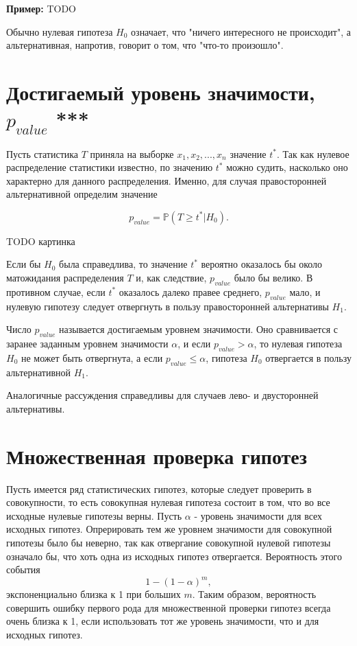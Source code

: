 \textbf{Пример:} TODO

Обычно нулевая гипотеза $H_0$ означает, что "ничего интересного не происходит", а альтернативная, напротив, говорит о том, что "что-то произошло".

\section{Достигаемый уровень значимости, $p_{value}$ ***}

Пусть статистика $T$ приняла на выборке $x_1, x_2, ..., x_n$ значение $t^*$. Так как нулевое распределение статистики известно, по значению $t^*$ можно судить, насколько оно характерно для данного распределения. Именно, для случая правосторонней альтернативной определим значение

$$
p_{value} = \mathbb{P}(T \geqslant t^* | H_0).
$$

TODO картинка

Если бы $H_0$ была справедлива, то значение $t^*$ вероятно оказалось бы около матожидания распределения $T$ и, как следствие, $p_{value}$ было бы велико. В противном случае, если $t^*$ оказалось далеко правее среднего, $p_{value}$ мало, и нулевую гипотезу следует отвергнуть в пользу правосторонней альтернативы $H_1$.

Число $p_{value}$ называется достигаемым уровнем значимости. Оно сравнивается с заранее заданным уровнем значимости $\alpha$, и если $p_{value} > \alpha$, то нулевая гипотеза $H_0$ не может быть отвергнута, а если $p_{value} \leqslant \alpha$, гипотеза $H_0$ отвергается в пользу альтернативной $H_1$.

Аналогичные рассуждения справедливы для случаев лево- и двусторонней альтернативы.

\section{Множественная проверка гипотез}

Пусть имеется ряд статистических гипотез, которые следует проверить в совокупности, то есть совокупная нулевая гипотеза состоит в том, что во все исходные нулевые гипотезы верны. Пусть $\alpha$ - уровень значимости для всех исходных гипотез. Опрерировать тем же уровнем значимости для совокупной гипотезы было бы неверно, так как отвергание совокупной нулевой гипотезы означало бы, что хоть одна из исходных гипотез отвергается. Вероятность этого события
$$
1 - (1 - \alpha)^m,
$$
экспоненциально близка к 1 при больших $m$. Таким образом, вероятность совершить ошибку первого рода для множественной проверки гипотез всегда очень близка к 1, если использовать тот же уровень значимости, что и для исходных гипотез.

